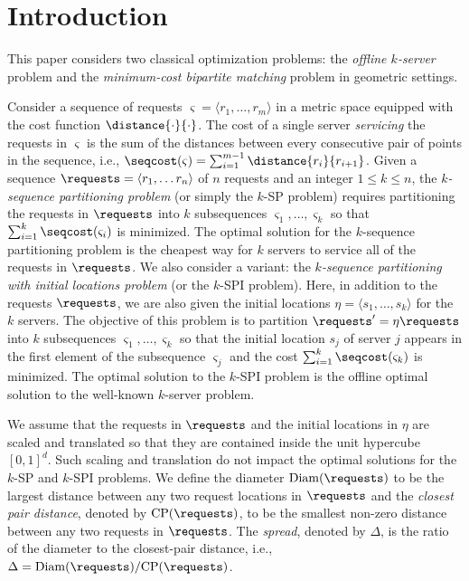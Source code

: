 
\section{Introduction}\label{sec:introduction}


This paper considers two classical optimization problems: the \emph{offline $k$-server} problem and the \emph{minimum-cost bipartite matching} problem in geometric settings. 
%

 
 Consider a sequence of requests $\varsigma = \langle r_1,\ldots, r_m \rangle$ in a metric space equipped with the cost function $\distance{\cdot}{\cdot}$. The cost of a single server \emph{servicing} the requests in $\varsigma$ is the sum of the distances between every consecutive pair of points in the sequence, i.e.,  $\seqcost(\varsigma)=\sum_{i=1}^{m-1} \distance{r_i}{r_{i+1}}$. Given a sequence $\requests = \langle r_1,\ldots r_n\rangle$ of $n$ requests and an integer $1 \le k \le n$, the \emph{$k$-sequence partitioning problem} (or simply the $k$-SP problem) requires partitioning the requests in $\requests$ into $k$ subsequences $\varsigma_1, \ldots, \varsigma_k$ so that $\sum_{i=1}^{k}\seqcost(\varsigma_i)$ is minimized. The optimal solution for the $k$-sequence partitioning problem is the cheapest way for $k$ servers to service all of the requests in $\requests$. 
We also consider a variant: the \emph{$k$-sequence partitioning with initial locations problem} (or the $k$-SPI problem). Here,
 in addition to the requests $\requests$, we are also given the initial locations $\eta=\langle s_1,\ldots, s_k\rangle$ for the $k$ servers. The objective of this problem is to partition $\requests' = \eta \requests$ into $k$ subsequences $\varsigma_1,\ldots, \varsigma_k$ so that the initial location $s_j$ of server $j$ appears in the first element of the subsequence $\varsigma_j$ and the cost $\sum_{i=1}^{k}\seqcost(\varsigma_k)$ is minimized. 
The optimal solution to the $k$-SPI problem is the offline optimal solution to the well-known $k$-server problem. 

We assume that the requests in $\requests$ and the initial locations in $\eta$ are scaled and translated so that they are contained inside the unit hypercube $[0,1]^d$. Such scaling and translation do not impact the optimal solutions for the $k$-SP and $k$-SPI problems. We define the diameter $\mathrm{Diam}(\requests)$ to be the largest distance between any two request locations in $\requests$ and the \emph{closest pair distance}, denoted by $\mathrm{CP}(\requests)$, to be the smallest non-zero distance between any two requests in $\requests$. The \emph{spread}, denoted by $\Delta$, is the ratio of the diameter to the closest-pair distance, i.e., $\Delta=\mathrm{Diam}(\requests)/\mathrm{CP}(\requests)$. 


